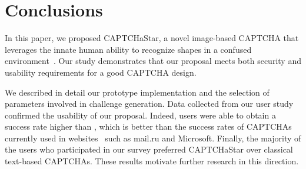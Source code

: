 \documentclass[conference]{IEEEtran}
\begin{document}
\section{Conclusions}
\label{conclusions}
In this paper, we proposed CAPTCHaStar, a novel image-based CAPTCHA that leverages the innate human ability to recognize shapes in a confused environment~\cite{kanizsa1979organization}.
Our study demonstrates that our proposal meets both security and usability requirements for a good CAPTCHA design.

We described in detail our prototype implementation and the selection of parameters involved in challenge generation. Data collected from our user study confirmed the usability of our proposal.
Indeed, users were able to obtain a success rate higher than , which is better than the success rates of CAPTCHAs currently used in websites~\cite{bursztein2010good} such as mail.ru and Microsoft.
Finally, the majority of the users who participated in our survey preferred CAPTCHaStar over classical text-based CAPTCHAs.
These results motivate further research in this direction.

\begin{comment}
\begin{figure}[ht!]
\centering
\begin{subfigure}{.48\textwidth}
\texttt{[image: attack\_success\_tollerance25\_method\_new]}
\caption{Success rate.}
\label{fig:successRateML}
\end{subfigure}

\begin{subfigure}{.48\textwidth}
\texttt{[image: attack\_time\_tollerance25\_method\_new]}
\caption{Average execution time.}
\label{fig:timeML}
\end{subfigure}

\caption{Success rate and average execution time for machine learning-based attacks, varying the tile size parameter ().}
\label{fig:MLSuccess}

\end{figure}
\end{comment}
\end{document}
